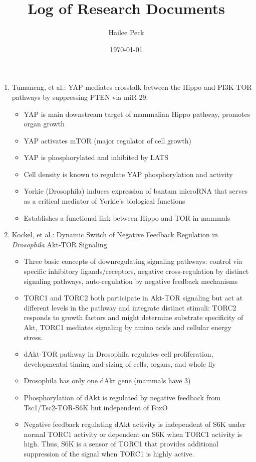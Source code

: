 \documentclass[12pt]{article}
\begin{document}
\sffamily
\title{Log of Research Documents}
\date{\today}
\author{Hailee Peck}
\maketitle

\begin{enumerate}
\item Tumaneng, et al.: YAP mediates crosstalk between the Hippo and PI3K-TOR pathways by suppressing PTEN via miR-29.
\begin{itemize}
	\item YAP is main downstream target of mammalian Hippo pathway, 
	promotes organ growth
	\item YAP activates mTOR (major regulator of cell growth)
	\item YAP is phosphorylated and inhibited by LATS
	\item Cell density is known to regulate YAP phosphorylation and 
	activity
	\item Yorkie (Drosophila) induces expression of bantam microRNA that serves as a critical mediator of Yorkie's biological functions
	\item Establishes a functional link between Hippo and TOR in mammals

\end{itemize}

\item Kockel, et al.: Dynamic Switch of Negative Feedback Regulation in \textit{Drosophila} Akt-TOR Signaling
\begin{itemize}
	\item Three basic concepts of downregulating signaling pathways: control via specific inhibitory ligands/receptors, negative cross-regulation by distinct signaling pathways, auto-regulation by negative feedback mechanisms
	\item TORC1 and TORC2 both participate in Akt-TOR signaling but act at different levels in the pathway and integrate distinct stimuli: TORC2 responds to growth factors and might determine substrate specificity of Akt, TORC1 mediates signaling by amino acids and cellular energy stress.
	\item dAkt-TOR pathway in Drosophila regulates cell proliferation, developmental timing and sizing of cells, organs, and whole fly
	\item Drosophila has only one dAkt gene (mammals have 3)
	\item Phosphorylation of dAkt is regulated by negative feedback from Tsc1/Tsc2-TOR-S6K but independent of FoxO
	\item Negative feedback regulating dAkt activity is independent of S6K under normal TORC1 activity or dependent on S6K when TORC1 activity is high. Thus, S6K is a sensor of TORC1 that provides additional suppression of the signal when TORC1 is highly active. 
\end{itemize}


\end{enumerate}
\end{document}
